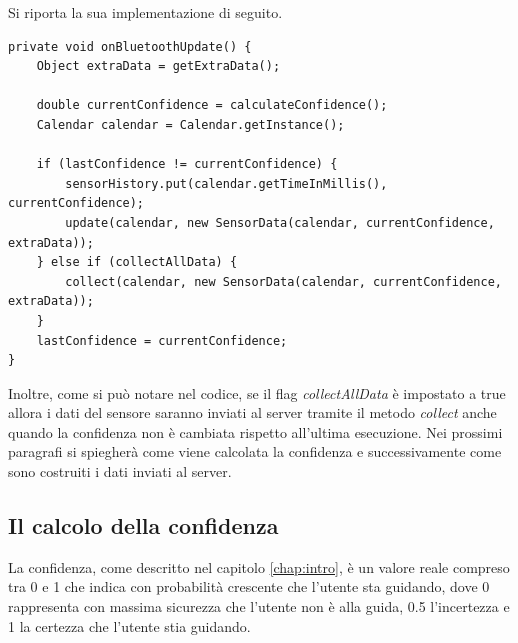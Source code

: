 Si riporta la sua implementazione di seguito.

\begin{verbatim}
private void onBluetoothUpdate() {
    Object extraData = getExtraData();

    double currentConfidence = calculateConfidence();
    Calendar calendar = Calendar.getInstance();

    if (lastConfidence != currentConfidence) {
        sensorHistory.put(calendar.getTimeInMillis(), currentConfidence);
        update(calendar, new SensorData(calendar, currentConfidence, extraData));
    } else if (collectAllData) {
        collect(calendar, new SensorData(calendar, currentConfidence, extraData));
    }
    lastConfidence = currentConfidence;
}
\end{verbatim}
Inoltre, come si può notare nel codice, se il flag \textit{collectAllData} è impostato a true allora i dati del sensore saranno inviati al server tramite il metodo \textit{collect} anche quando la confidenza non è cambiata rispetto all'ultima esecuzione. Nei prossimi paragrafi si spiegherà come viene calcolata la confidenza e successivamente come sono costruiti i dati inviati al server.

\subsection{Il calcolo della confidenza}
La confidenza, come descritto nel capitolo \ref{chap:intro}, è un valore reale compreso tra 0 e 1 che indica con probabilità crescente che l'utente sta guidando, dove 0 rappresenta con massima sicurezza che l'utente non è alla guida, 0.5 l'incertezza e 1 la certezza che l'utente stia guidando.

